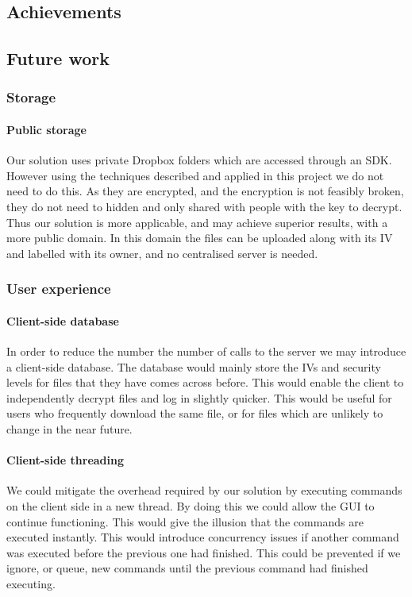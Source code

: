 \documentclass[12pt, titlepage]{article}
\begin{document}
\subsection{Achievements}

\subsection{Future work}
\subsubsection*{Storage}
\paragraph*{Public storage} Our solution uses private Dropbox folders which are accessed through an SDK. However using the techniques described and applied in this project we do not need to do this. As they are encrypted, and the encryption is not feasibly broken, they do not need to hidden and only shared with people with the key to decrypt. Thus our solution is more applicable, and may achieve superior results, with a more public domain. In this domain the files can be uploaded along with its IV and labelled with its owner, and no centralised server is needed.
\subsubsection*{User experience}
\paragraph*{Client-side database} In order to reduce the number the number of calls to the server we may introduce a client-side database. The database would mainly store the IVs and security levels for files that they have comes across before. This would enable the client to independently decrypt files and log in slightly quicker. This would be useful for users who frequently download the same file, or for files which are unlikely to change in the near future.
\paragraph*{Client-side threading} We could mitigate the overhead required by our solution by executing commands on the client side in a new thread. By doing this we could allow the GUI to continue functioning. This would give the illusion that the commands are executed instantly. This would introduce concurrency issues if another command was executed before the previous one had finished. This could be prevented if we ignore, or queue, new commands until the previous command had finished executing. 
\end{document}
